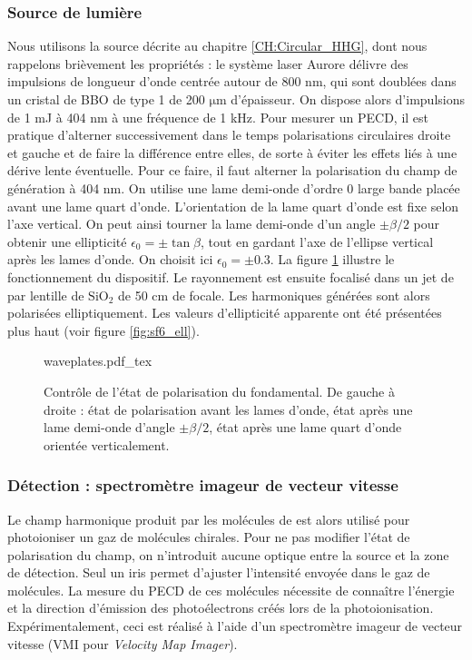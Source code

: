 \subsubsection{Source de lumière}
Nous utilisons la source décrite au chapitre \ref{CH:Circular_HHG}, dont nous rappelons brièvement les propriétés : le système laser Aurore délivre des impulsions de longueur d'onde centrée autour de 800 nm, qui sont doublées dans un cristal de BBO de type 1 de 200 $\si{\micro\metre}$ d'épaisseur. On dispose alors d'impulsions de 1 mJ à 404 nm à une fréquence de 1 kHz. Pour mesurer un PECD, il est pratique d'alterner successivement dans le temps polarisations circulaires droite et gauche et de faire la différence entre elles, de sorte à éviter les effets liés à une dérive lente éventuelle. Pour ce faire, il faut alterner la polarisation du champ de génération à 404 nm. On utilise une lame demi-onde d'ordre 0 large bande placée avant une lame quart d'onde. L'orientation de la lame quart d'onde est fixe selon l'axe vertical. On peut ainsi tourner la lame demi-onde d'un angle $\pm\beta/2$ pour obtenir une ellipticité $\epsilon_0 = \pm \tan\beta$, tout en gardant l'axe de l'ellipse vertical après les lames d'onde. On choisit ici $\epsilon_0 = \pm 0.3$. La figure \ref{fig:waveplates} illustre le fonctionnement du dispositif. Le rayonnement est ensuite focalisé dans un jet de  par lentille de $\text{SiO}_2$ de 50 cm de focale. Les harmoniques générées sont alors polarisées elliptiquement. Les valeurs d'ellipticité apparente ont été présentées plus haut (voir figure \ref{fig:sf6_ell}).

\begin{figure}[!ht]
\centering
\def\svgwidth{0.7\columnwidth}
{waveplates.pdf_tex}
\caption{Contrôle de l'état de polarisation du fondamental. De gauche à droite : état de polarisation avant les lames d'onde, état après une lame demi-onde d'angle $\pm\beta/2$, état après une lame quart d'onde orientée verticalement.}
\label{fig:waveplates}
\end{figure}

\subsubsection{Détection : spectromètre imageur de vecteur vitesse}
Le champ harmonique produit par les molécules de  est alors utilisé pour photoioniser un gaz de molécules chirales. Pour ne pas modifier l'état de polarisation du champ, on n'introduit aucune optique entre la source et la zone de détection. Seul un iris permet d'ajuster l'intensité envoyée dans le gaz de molécules. La mesure du PECD de ces molécules nécessite de connaître l'énergie et la direction d'émission des photoélectrons créés lors de la photoionisation. Expérimentalement, ceci est réalisé à l'aide d'un spectromètre imageur de vecteur vitesse (VMI pour \textit{Velocity Map Imager}). 

